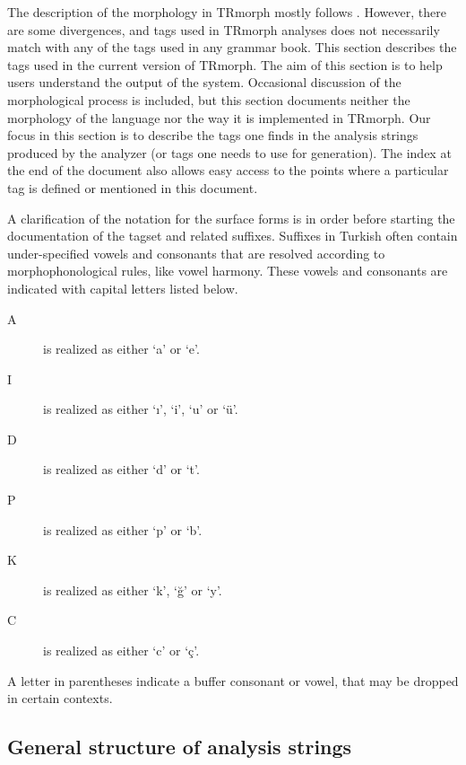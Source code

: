 \documentclass[twocolumn]{article}
\begin{document}
The description of the morphology in TRmorph mostly follows
\textcite{goksel2005}. However, there are some divergences, and tags used
in TRmorph analyses does not necessarily match with any of the tags
used in any grammar book. This section describes the tags used in the
current version of TRmorph.  The aim of this section is to help users
understand the output of the system. Occasional discussion of the
morphological process is included, but this section documents neither
the morphology of the language nor the way it is implemented in
TRmorph.  Our focus in this section is to describe the tags one finds
in the analysis strings produced by the analyzer (or tags one
needs to use for generation).  The index at the end of the document
also allows easy access to the points where a particular tag is
defined or mentioned in this document.

A clarification of the notation for the surface forms is in order
before starting the documentation of the tagset and related suffixes.
Suffixes in Turkish often contain under-specified vowels and
consonants that are resolved according to morphophonological rules,
like vowel harmony. These vowels and consonants are indicated with
capital letters listed below.

\begin{description}
\item[A] is realized as either `a' or  `e'.
\item[I] is realized as either `ı', `i', `u' or  `ü'.
\item[D] is realized as either `d' or  `t'.
\item[P] is realized as either `p' or  `b'.
\item[K] is realized as either `k', `ğ' or  `y'.
\item[C] is realized as either `c' or  `ç'.
\end{description}

A letter in parentheses indicate a buffer consonant or vowel, that may
be dropped in certain contexts.

\subsection{General structure of analysis strings}
\end{document}
